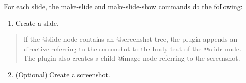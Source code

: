 \documentclass[a4paper,10pt,english]{sphinxmanual}
\begin{document}
For each slide, the make-slide and make-slide-show
commands do the following:
\begin{enumerate}
\item {} 
Create a slide.

\end{enumerate}
\begin{quote}

If the @slide node contains an @screenshot tree,
the plugin appends an  directive
referring to the screenshot to the body text of
the @slide node. The plugin also creates a child
@image node referring to the screenshot.
\end{quote}
\begin{enumerate}
\setcounter{enumi}{1}
\item {} 
(Optional) Create a screenshot.

\end{enumerate}
\end{document}
